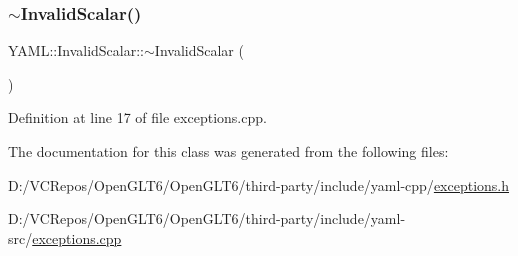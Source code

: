 \mbox{\label{class_y_a_m_l_1_1_invalid_scalar_a2fa46dc89152edbf6bf1bbccd019f74a}} 
\subsubsection{\texorpdfstring{$\sim$InvalidScalar()}{~InvalidScalar()}}
{\footnotesize\ttfamily Y\+A\+M\+L\+::\+Invalid\+Scalar\+::$\sim$\+Invalid\+Scalar (\begin{DoxyParamCaption}{ }\end{DoxyParamCaption})\hspace{0.3cm}{\ttfamily [virtual]}}



Definition at line 17 of file exceptions.\+cpp.



The documentation for this class was generated from the following files\+:\begin{DoxyCompactItemize}
\item 
D\+:/\+V\+C\+Repos/\+Open\+G\+L\+T6/\+Open\+G\+L\+T6/third-\/party/include/yaml-\/cpp/\mbox{\hyperlink{exceptions_8h}{exceptions.\+h}}\item 
D\+:/\+V\+C\+Repos/\+Open\+G\+L\+T6/\+Open\+G\+L\+T6/third-\/party/include/yaml-\/src/\mbox{\hyperlink{exceptions_8cpp}{exceptions.\+cpp}}\end{DoxyCompactItemize}
